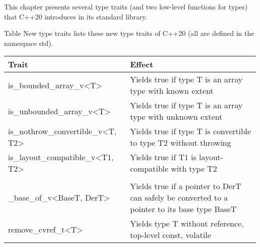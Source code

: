 This chapter presents several type traits (and two low-level functions for types) that C++20 introduces in its standard library.

Table New type traits lists these new type traits of C++20 (all are defined in the namespace std).


\begin{longtable}[c]{|l|l|}
\hline
\textbf{Trait}                                                                                                                 & \textbf{Effect}                                                                                                           \\ \hline
\endfirsthead
%
\endhead
%
is\_bounded\_array\_v\textless{}T\textgreater{}                                                                                & Yields true if type T is an array type with known extent                                                                  \\ \hline
is\_unbounded\_array\_v\textless{}T\textgreater{}                                                                              & Yields true if type T is an array type with unknown extent                                                                \\ \hline
is\_nothrow\_convertible\_v\textless{}T, T2\textgreater{}                                                                      & Yields true if type T is convertible to type T2 without throwing                                                          \\ \hline
is\_layout\_compatible\_v\textless{}T1, T2\textgreater{}                                                                       & Yields true if T1 is layout-compatible with type T2                                                                       \\ \hline
\begin{tabular}[c]{@{}l@{}}is\_pointer\_interconvertible...\\   \_base\_of\_v\textless{}BaseT, DerT\textgreater{}\end{tabular} & Yields true if a pointer to DerT can safely be converted to a pointer to its base type BaseT                              \\ \hline
remove\_cvref\_t\textless{}T\textgreater{}                                                                                     & Yields type T without reference, top-level const, volatile                                                                \\ \hline

\end{longtable}
